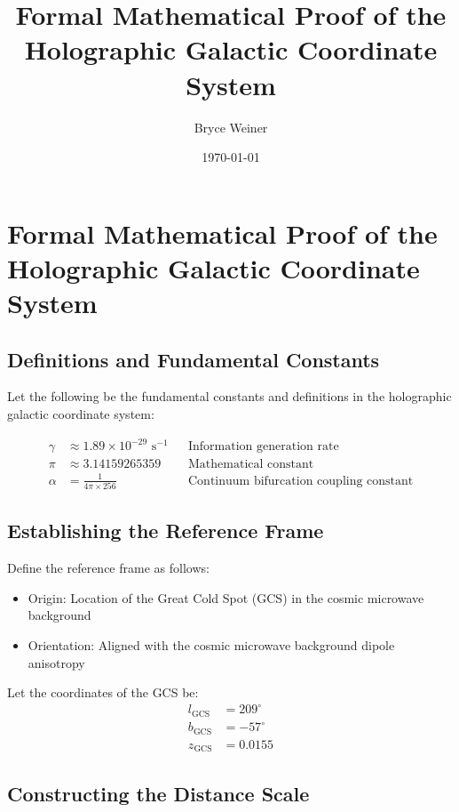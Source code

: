 \documentclass{article}
\begin{document}
\title{Formal Mathematical Proof of the Holographic Galactic Coordinate System}
\author{Bryce Weiner}
\date{\today}

\section*{Formal Mathematical Proof of the Holographic Galactic Coordinate System}

\subsection*{Definitions and Fundamental Constants}

Let the following be the fundamental constants and definitions in the holographic galactic coordinate system:

\begin{align}
\gamma &\approx 1.89 \times 10^{-29} \text{ s}^{-1} && \text{Information generation rate} \\
\pi &\approx 3.14159265359 && \text{Mathematical constant} \\
\alpha &= \frac{1}{4\pi \times 256} && \text{Continuum bifurcation coupling constant}
\end{align}

\subsection*{Establishing the Reference Frame}

Define the reference frame as follows:

\begin{itemize}
    \item Origin: Location of the Great Cold Spot (GCS) in the cosmic microwave background
    \item Orientation: Aligned with the cosmic microwave background dipole anisotropy
\end{itemize}

Let the coordinates of the GCS be:
\begin{align}
l_\text{GCS} &= 209^\circ \\
b_\text{GCS} &= -57^\circ \\
z_\text{GCS} &= 0.0155
\end{align}

\subsection*{Constructing the Distance Scale}
\end{document}
